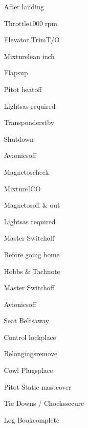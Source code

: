 \begin{multicols}{2}
\begin{checklist}{After landing}
    \item{Throttle}{$1000$ rpm}
    \item{Elevator Trim}{T/O}
    \item{Mixture}{lean  inch}
    \item{Flaps}{up}
    \item{Pitot heat}{off}
    \item{Lights}{as required}
    \item{Transponder}{stby}
\end{checklist}

\begin{checklist}{Shutdown}
    \item{Avionics}{off}
    \item{Magnetos}{check}
    \item{Mixture}{ICO}
    \item{Magnetos}{off \& out}
    \item{Lights}{as required}
    \item{Master Switch}{off}
\end{checklist}

\begin{checklist}{Before going home}
    \item{Hobbs \& Tach}{note}
    \item{Master Switch}{off}
    \item{Avionics}{off}
    \item{Seat Belts}{away}
    \item{Control lock}{place}
    \item{Belongings}{remove}
    \item{Cowl Plugs}{place}
    \item{Pitot Static mast}{cover}
    \item{Tie Downs / Chocks}{secure}
    \item{Log Book}{complete}
\end{checklist}
\end{multicols}

